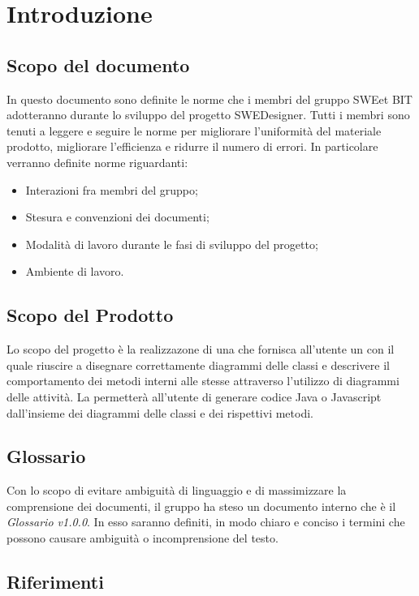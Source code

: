 \section{Introduzione}
  \subsection{Scopo del documento}
          In questo documento sono definite le norme che i membri del gruppo SWEet BIT adotteranno durante lo sviluppo del progetto SWEDesigner.
          Tutti i membri sono tenuti a leggere e seguire le norme per migliorare l’uniformità del materiale prodotto, migliorare l’efficienza
          e ridurre il numero di errori.
          In particolare verranno definite norme riguardanti:
            \begin{itemize}
              \item Interazioni fra membri del gruppo;
              \item Stesura e convenzioni dei documenti;
              \item Modalità di lavoro durante le fasi di sviluppo del progetto;
              \item Ambiente di lavoro.
            \end{itemize}
  \subsection{Scopo del Prodotto}
          Lo scopo del progetto è la realizzazone di una  che fornisca all'utente un   con il quale riuscire a disegnare correttamente diagrammi delle classi
          e descrivere il comportamento dei metodi interni alle stesse attraverso l'utilizzo di diagrammi delle attività.
          La  permetterà all'utente di generare codice Java o Javascript dall'insieme dei diagrammi delle classi e dei rispettivi metodi.
  \subsection{Glossario}
          Con lo scopo di evitare ambiguità di linguaggio e di massimizzare la comprensione dei documenti, il
          gruppo ha steso un documento interno che è il \emph{Glossario v1.0.0}. In esso saranno definiti, in modo
          chiaro e conciso i termini che possono causare ambiguità o incomprensione del testo.
  \subsection{Riferimenti}
